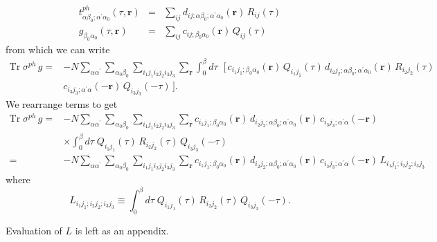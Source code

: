 \begin{eqnarray}
t^{ph}_{\alpha \beta_0;\alpha^{\prime}\alpha_0}(\tau,\mathbf{r})
& = & \sum_{ij} 
d_{ij;\alpha \beta_0; \alpha^{\prime}\alpha_0}(\mathbf{r})\,
R_{ij}(\tau) \\
g_{\beta_0 \alpha_0}(\tau,\mathbf{r}) & = &
\sum_{ij} c_{ij; \beta_0 \alpha_0}(\mathbf{r})\, Q_{ij}(\tau) 
\end{eqnarray}
from which we can write
\begin{equation}
\begin{split}
\mathrm{Tr}\;\sigma^{ph}\,g = & -
N \sum_{\alpha\alpha^{\prime}} \sum_{\alpha_0\beta_0}
\sum_{i_1 j_1 i_2 j_2 i_3 j_3}
\sum_{\mathbf{r}} \int_0^{\beta} d\tau\;
\; \big[\,c_{i_1 j_1; \beta_0 \alpha_0}(\mathbf{r})\,Q_{i_1 j_1}(\tau)\,
d_{i_2 j_2; \alpha \beta_0; \alpha^{\prime}\alpha_0}(\mathbf{r})\,
R_{i_2 j_2}(\tau)\\
& c_{i_3 j_3; \alpha^{\prime}\alpha}(-\mathbf{r})\,
Q_{i_3 j_3}(-\tau)\,\big].
\end{split}
\end{equation}
We rearrange terms to get
\begin{equation}
\begin{split}
\mathrm{Tr}\;\sigma^{ph}\,g = & -
N \sum_{\alpha\alpha^{\prime}} \sum_{\alpha_0\beta_0}
\sum_{i_1 j_1 i_2 j_2 i_3 j_3}
\sum_{\mathbf{r}} 
c_{i_1 j_1; \beta_0 \alpha_0}(\mathbf{r})\,
d_{i_2 j_2; \alpha \beta_0; \alpha^{\prime}\alpha_0}(\mathbf{r})\,
c_{i_3 j_3; \alpha^{\prime}\alpha}(-\mathbf{r}) \\
& \times
\int_0^{\beta} d\tau\;
Q_{i_1 j_1}(\tau)\,
R_{i_2 j_2}(\tau)\,
Q_{i_3 j_3}(-\tau) \\
= &- N \sum_{\alpha\alpha^{\prime}} \sum_{\alpha_0\beta_0}
\sum_{i_1 j_1 i_2 j_2 i_3 j_3}
\sum_{\mathbf{r}} 
c_{i_1 j_1; \beta_0 \alpha_0}(\mathbf{r})\,
d_{i_2 j_2; \alpha \beta_0;\alpha^{\prime}\alpha_0}(\mathbf{r})\,
c_{i_3 j_3; \alpha^{\prime}\alpha}(-\mathbf{r})
\, L_{i_1 j_1; i_2 j_2; i_3 j_3}
\end{split}
\end{equation}
where
\begin{equation}
L_{i_1 j_1; i_2 j_2; i_3 j_3} \equiv \int_0^{\beta} d\tau\;
Q_{i_1 j_1}(\tau)\,
R_{i_2 j_2}(\tau)\,
Q_{i_3 j_3}(-\tau).
\end{equation}

Evaluation of $L$ is left as an appendix.
